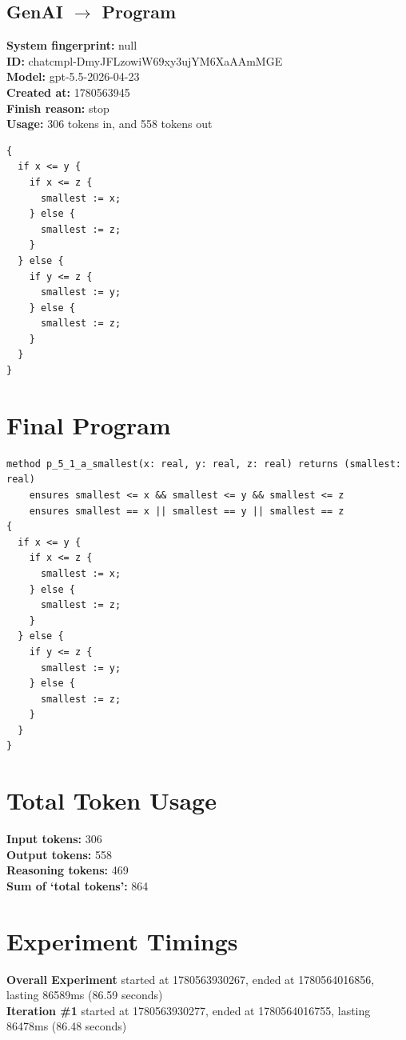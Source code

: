 \documentclass{article}
\begin{document}
\subsection*{GenAI $\rightarrow$ Program}
\textbf{System fingerprint: }null
\\\textbf{ID: }chatcmpl-DmyJFLzowiW69xy3ujYM6XaAAmMGE
\\\textbf{Model: }gpt-5.5-2026-04-23
\\\textbf{Created at: }1780563945
\\\textbf{Finish reason: }stop
\\\textbf{Usage: }306 tokens in, and 558 tokens out
\begin{lstlisting}
{
  if x <= y {
    if x <= z {
      smallest := x;
    } else {
      smallest := z;
    }
  } else {
    if y <= z {
      smallest := y;
    } else {
      smallest := z;
    }
  }
}
\end{lstlisting}
\section*{Final Program}
\begin{lstlisting}
method p_5_1_a_smallest(x: real, y: real, z: real) returns (smallest: real)
	ensures smallest <= x && smallest <= y && smallest <= z
	ensures smallest == x || smallest == y || smallest == z
{
  if x <= y {
    if x <= z {
      smallest := x;
    } else {
      smallest := z;
    }
  } else {
    if y <= z {
      smallest := y;
    } else {
      smallest := z;
    }
  }
}
\end{lstlisting}
\section*{Total Token Usage}
\textbf{Input tokens: }306
\\\textbf{Output tokens: }558
\\\textbf{Reasoning tokens: }469
\\\textbf{Sum of `total tokens': }864
\section*{Experiment Timings}
\textbf{Overall Experiment} started at 1780563930267, ended at 1780564016856, lasting 86589ms (86.59 seconds)
\\\textbf{Iteration \#1} started at 1780563930277, ended at 1780564016755, lasting 86478ms (86.48 seconds)
\end{document}
